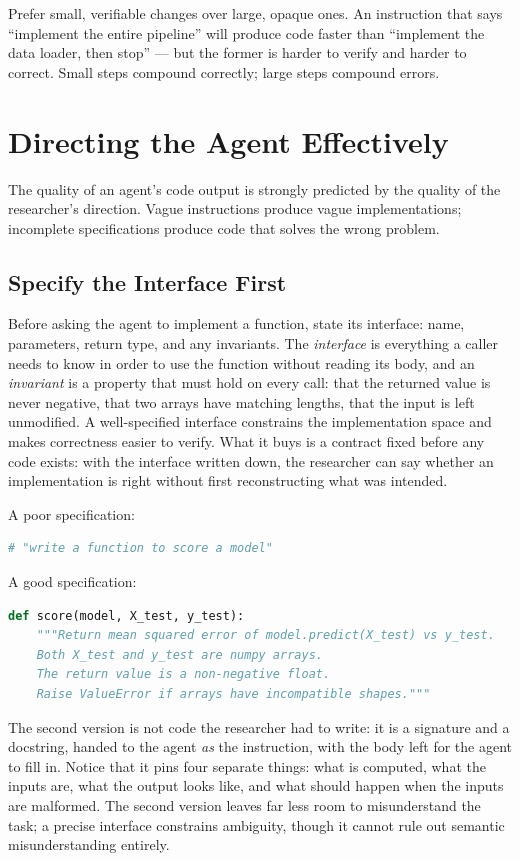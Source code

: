 \begin{principle}
\label{principle:IncrementalDevelopment}
Prefer small, verifiable changes over large, opaque ones.
An instruction that says ``implement the entire pipeline'' will produce code faster than ``implement the data loader, then stop'' — but the former is harder to verify and harder to correct.
Small steps compound correctly; large steps compound errors.
\end{principle}

\section{Directing the Agent Effectively}

The quality of an agent's code output is strongly predicted by the quality of the researcher's direction.
Vague instructions produce vague implementations; incomplete specifications produce code that solves the wrong problem.

\subsection{Specify the Interface First}

Before asking the agent to implement a function, state its interface: name, parameters, return type, and any invariants.
The \emph{interface} is everything a caller needs to know in order to use the function without reading its body, and an \emph{invariant} is a property that must hold on every call: that the returned value is never negative, that two arrays have matching lengths, that the input is left unmodified.
A well-specified interface constrains the implementation space and makes correctness easier to verify.
What it buys is a contract fixed before any code exists: with the interface written down, the researcher can say whether an implementation is right without first reconstructing what was intended.

\begin{example}
A poor specification:
\begin{lstlisting}[language=python]
# "write a function to score a model"
\end{lstlisting}
A good specification:
\begin{lstlisting}[language=python]
def score(model, X_test, y_test):
    """Return mean squared error of model.predict(X_test) vs y_test.
    Both X_test and y_test are numpy arrays.
    The return value is a non-negative float.
    Raise ValueError if arrays have incompatible shapes."""
\end{lstlisting}
The second version is not code the researcher had to write: it is a signature and a docstring, handed to the agent \emph{as} the instruction, with the body left for the agent to fill in.
Notice that it pins four separate things: what is computed, what the inputs are, what the output looks like, and what should happen when the inputs are malformed.
The second version leaves far less room to misunderstand the task; a precise interface constrains ambiguity, though it cannot rule out semantic misunderstanding entirely.
\end{example}

